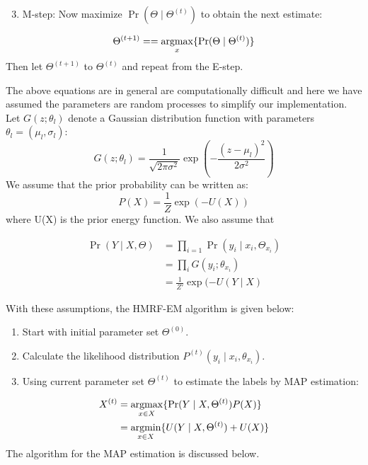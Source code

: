 \begin{enumerate}
	\setcounter{enumi}{2}
	\item M-step: Now maximize \(\Pr(\Theta \mid \Theta^{(t)})\) to obtain the next
	estimate:
\end{enumerate}
\begin{equation}
\Theta^{(t+1)}==\operatorname*{argmax}_x\{\Pr(\Theta \mid \Theta^{(t)})\} 
\end{equation}
Then let \(\Theta^{(t+1)}\) to \(\Theta^{(t)}\) and repeat from the E-step.

The above equations are in general are computationally difficult and here we have assumed the parameters are random processes to simplify our implementation\cite{monfrini2003image}. Let \(G(z;\theta_l)\) denote a Gaussian distribution function with parameters \(\theta_l=(\mu_l,\sigma_l)\):
\begin{equation}
G(z;\theta_l)= \frac{1}{\sqrt{2\pi\sigma^2}}\exp(-\frac{(z-\mu_l)^2}{2\sigma^2})   
\end{equation}
We assume that the prior probability can be written as:
\begin{equation}
P(X)=\frac{1}{Z}\exp{(-U(X))}  
\end{equation}
where U(X) is the prior energy function. We also assume that


\begin{equation}\label{eq2}
\begin{split}
\Pr( Y \mid X,\Theta) & =\prod_{i=1}^{ }\Pr( y_i \mid x_i,\Theta_{x_i})\\
& =\prod_{i}^{ }G(y_i;\theta_{x_i})\\
& =\frac{1}{Z'}\exp{(-U(Y \mid X)} 
\end{split}
\end{equation}

With these assumptions, the HMRF-EM algorithm is given below:

\begin{enumerate}
	\item Start with initial parameter set \(\Theta^{(0)}\).
	\item Calculate the likelihood distribution \(P^{(t)}(y_i \mid x_i,\theta_{x_i})\).
	\item Using current parameter set \(\Theta^{(t)}\) to estimate the labels
	by MAP estimation:
\end{enumerate}

\begin{equation}
\begin{split}
X^{(t)} & =\operatorname*{argmax}_{x \in X}\{\Pr( Y \mid X, \Theta^{(t)})P(X)\}\\
&= \operatorname*{argmin}_{x \in X} \{U( Y \mid X, \Theta^{(t)}) + U(X)\}
\end{split}
\end{equation}
The algorithm for the MAP estimation is discussed below.


